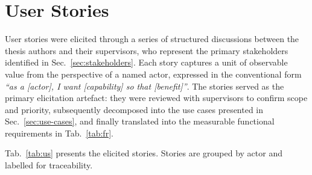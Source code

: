 \section{User Stories}
\label{sec:user-stories}

User stories were elicited through a series of structured discussions between the thesis authors and their supervisors, who represent the primary stakeholders identified in Sec.~\ref{sec:stakeholders}.
Each story captures a unit of observable value from the perspective of a named actor, expressed in the conventional form \textit{``as a [actor], I want [capability] so that [benefit]''}.
The stories served as the primary elicitation artefact: they were reviewed with supervisors to confirm scope and priority, subsequently decomposed into the use cases presented in Sec.~\ref{sec:use-cases}, and finally translated into the measurable functional requirements in Tab.~\ref{tab:fr}.

Tab.~\ref{tab:us} presents the elicited stories.
Stories are grouped by actor and labelled for traceability.

